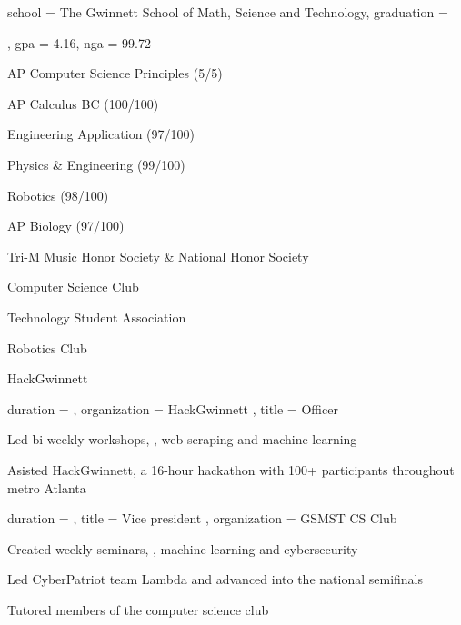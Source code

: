 \documentclass[inter=true, sidebar-width=2.25in, primary=slate]{clean-resume}
\begin{document}
  \begin{main}
    
    \education
    {
      school = {The Gwinnett School of Math, Science and Technology},
      graduation = {\date{2025/5}},
      gpa = 4.16,
      nga = 99.72
    }
  
    \begin{lst}
      [
        title = {Relevant Coursework},
        columns = 2,
    	]
      \item AP Computer Science Principles (5/5)
      \item AP Calculus BC (100/100)
      \item Engineering Application (97/100)
      \item Physics \& Engineering (99/100)
      \item Robotics (98/100)
      \item AP Biology (97/100)
    \end{lst}
    
    \begin{lst}
      [
        title = Honors,
        oneline = true,
      ]
      Tri-M Music Honor Society \& National Honor Society
    \end{lst}
    
    \begin{lst}
      [
        title = Clubs,
        columns = 2,
  	]
      \item Computer Science Club
      \item Technology Student Association
      \item Robotics Club
      \item HackGwinnett
    \end{lst}
    
    
    \begin{experience}
      {
        duration = {  },
        organization = { HackGwinnett },
        title = { Officer }
      }
      \item Led bi-weekly workshops, \eg, web scraping and machine learning
      \item Asisted HackGwinnett, a 16-hour hackathon with 100+ participants   throughout metro Atlanta
    \end{experience}
    
    \begin{experience}
      {
        duration = {  },
        title = { Vice president },
        organization = { GSMST CS Club }
      }
      \item Created weekly seminars, \eg, machine learning and cybersecurity
      \item Led CyberPatriot team Lambda and advanced into the national semifinals
      \item Tutored members of the computer science club
      

\end{experience}
\end{main}
\end{document}
